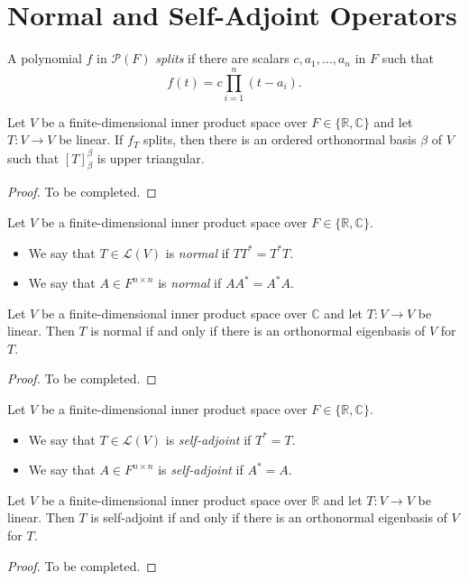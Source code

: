 \section{Normal and Self-Adjoint Operators}
\begin{definition}
  A polynomial $f$ in $\mathcal{P}(F)$ \emph{splits} if there are
  scalars $c, a_1, \dots, a_n$ in $F$ such that
  \begin{equation*}
    f(t) = c\prod_{i=1}^n (t - a_i).
  \end{equation*}
\end{definition}

\begin{theorem}
  Let $V$ be a finite-dimensional inner product space over
  $F \in \{\mathbb{R}, \mathbb{C}\}$ and let $T: V \to V$ be linear.
  If $f_T$ splits, then there is an ordered orthonormal basis $\beta$ of $V$
  such that $[T]_\beta^\beta$ is upper triangular.
\end{theorem}
\begin{proof}
  To be completed.
\end{proof}

\begin{definition}
  Let $V$ be a finite-dimensional inner product space over
  $F \in \{\mathbb{R}, \mathbb{C}\}$.
  \begin{itemize}
    \item We say that $T \in \mathcal{L}(V)$ is \emph{normal} if $TT^* = T^*T$.
    \item We say that $A \in F^{n \times n}$ is \emph{normal} if $AA^* = A^*A$.
  \end{itemize}
\end{definition}

\begin{theorem}
  Let $V$ be a finite-dimensional inner product space over $\mathbb{C}$ and let
  $T: V \to V$ be linear.
  Then $T$ is normal if and only if there is an orthonormal eigenbasis of $V$
  for $T$.
\end{theorem}
\begin{proof}
  To be completed.
\end{proof}

\begin{definition}
  Let $V$ be a finite-dimensional inner product space over
  $F \in \{\mathbb{R}, \mathbb{C}\}$.
  \begin{itemize}
    \item We say that $T \in \mathcal{L}(V)$ is \emph{self-adjoint} if
    $T^* = T$.
    \item We say that $A \in F^{n \times n}$ is \emph{self-adjoint} if
    $A^* = A$.
  \end{itemize}
\end{definition}

\begin{theorem}
  Let $V$ be a finite-dimensional inner product space over $\mathbb{R}$ and let
  $T: V \to V$ be linear.
  Then $T$ is self-adjoint if and only if there is an orthonormal eigenbasis of
  $V$ for $T$.
\end{theorem}
\begin{proof}
  To be completed.
\end{proof}